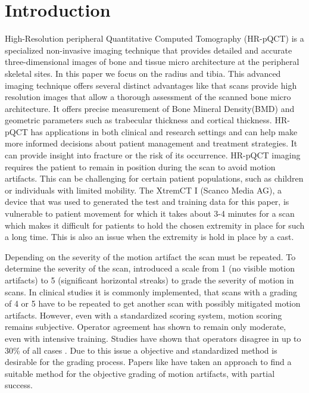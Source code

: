\documentclass[
a4paper, 
12pt,
grayscalebody, %
abstract=on,
twoside, BCOR10mm, 12pt, DIV13,headinclude, footexclude, final, abstracton, openright
]{ibireprt}
\numberwithin{equation}{chapter}
\numberwithin{table}{chapter}
\numberwithin{figure}{chapter}
\numberwithin{algorithm}{chapter}
\numberwithin{example}{chapter}
\numberwithin{example}{chapter}
\begin{document}



\chapter{Introduction}

High-Resolution peripheral Quantitative Computed Tomography (HR-pQCT) is a specialized non-invasive imaging technique that provides detailed and accurate three-dimensional images of bone and tissue micro architecture at the peripheral skeletal sites. In this paper we focus  on the radius and tibia. This advanced imaging technique offers several distinct advantages like that scans provide high resolution images that allow a thorough assessment of the scanned bone micro architecture. It offers precise measurement of Bone Mineral Density(BMD) and geometric parameters such as trabecular thickness and cortical thickness. HR-pQCT has applications in both clinical and research settings and can help make more informed decisions about patient management and treatment strategies. It can provide insight into fracture or the risk of its occurrence. HR-pQCT imaging requires the patient to remain in position during the scan to avoid motion artifacts. This can be challenging for certain patient populations, such as children or individuals with limited  mobility. The XtremCT I (Scanco Media AG), a device that  was used to generated the test and training data for this paper, is vulnerable to patient movement for which it takes about 3-4 minutes for a scan which makes it difficult for patients to hold the chosen extremity in place for such a long time. This is also an issue when the extremity is hold in place by a cast.

 Depending on the severity of the motion artifact the scan must be repeated. To determine the severity of the scan, \cite{Whittier2020} introduced a scale from 1 (no visible motion artifacts) to 5 (significant horizontal streaks) to grade the severity of motion in scans. In clinical studies it is commonly implemented, that scans with a grading of 4 or 5 have to be repeated to get another scan with possibly mitigated motion artifacts. However, even with a standardized scoring system, motion scoring remains subjective. Operator agreement has shown to remain only moderate, even with intensive training. Studies have shown that operators disagree in up to 30\% of all cases \cite{Walle2023}. Due to this issue a objective and standardized method is desirable for the grading process. Papers like \cite{Walle2023} have taken an approach to find a suitable method for the objective grading of motion artifacts, with partial success.
 
\end{document}

